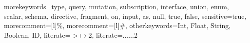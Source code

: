 
\newcommand{\includecode}[2][c]{
    
}

{
    morekeywords={type, query, mutation, subscription, interface, union, enum, scalar, schema, directive, fragment, on, input, as, null, true, false},
    sensitive=true,
    morecomment=[l]{\%},
    morecomment=[l]{\#},
    otherkeywords={Int, Float, String, Boolean, ID},
    literate={->}{{$\mapsto$}}2,
    literate={...}{{$\dots$}}2
}
